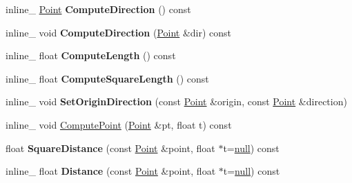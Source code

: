 \begin{DoxyCompactItemize}
\item 
inline\+\_\+ \hyperlink{classOpcode_1_1Point}{Point} {\bfseries Compute\+Direction} () const \hypertarget{classOpcode_1_1Segment_afddf61aff1ef61e8fe6cfb7d3f1da311}{}\label{classOpcode_1_1Segment_afddf61aff1ef61e8fe6cfb7d3f1da311}

\item 
inline\+\_\+ void {\bfseries Compute\+Direction} (\hyperlink{classOpcode_1_1Point}{Point} \&dir) const \hypertarget{classOpcode_1_1Segment_a5ef917baa6e7a96162a8942856660168}{}\label{classOpcode_1_1Segment_a5ef917baa6e7a96162a8942856660168}

\item 
inline\+\_\+ float {\bfseries Compute\+Length} () const \hypertarget{classOpcode_1_1Segment_a2a429d2010b6781bd848e31ffc979628}{}\label{classOpcode_1_1Segment_a2a429d2010b6781bd848e31ffc979628}

\item 
inline\+\_\+ float {\bfseries Compute\+Square\+Length} () const \hypertarget{classOpcode_1_1Segment_afbbc8ee7590d4eddc46123cd6abeb169}{}\label{classOpcode_1_1Segment_afbbc8ee7590d4eddc46123cd6abeb169}

\item 
inline\+\_\+ void {\bfseries Set\+Origin\+Direction} (const \hyperlink{classOpcode_1_1Point}{Point} \&origin, const \hyperlink{classOpcode_1_1Point}{Point} \&direction)\hypertarget{classOpcode_1_1Segment_a402142aefa43dcbb1761d55267bf33b8}{}\label{classOpcode_1_1Segment_a402142aefa43dcbb1761d55267bf33b8}

\item 
inline\+\_\+ void \hyperlink{classOpcode_1_1Segment_ad0988ae7067d43b027a3be918cc927ea}{Compute\+Point} (\hyperlink{classOpcode_1_1Point}{Point} \&pt, float t) const 
\item 
float {\bfseries Square\+Distance} (const \hyperlink{classOpcode_1_1Point}{Point} \&point, float $\ast$t=\hyperlink{IceTypes_8h_ac97b8ee753e4405397a42ad5799b0f9e}{null}) const \hypertarget{classOpcode_1_1Segment_adaac64662e3b372e393181b8de576a44}{}\label{classOpcode_1_1Segment_adaac64662e3b372e393181b8de576a44}

\item 
inline\+\_\+ float {\bfseries Distance} (const \hyperlink{classOpcode_1_1Point}{Point} \&point, float $\ast$t=\hyperlink{IceTypes_8h_ac97b8ee753e4405397a42ad5799b0f9e}{null}) const \hypertarget{classOpcode_1_1Segment_aa800570c23c588a5e543e42657983075}{}\label{classOpcode_1_1Segment_aa800570c23c588a5e543e42657983075}

\end{DoxyCompactItemize}
